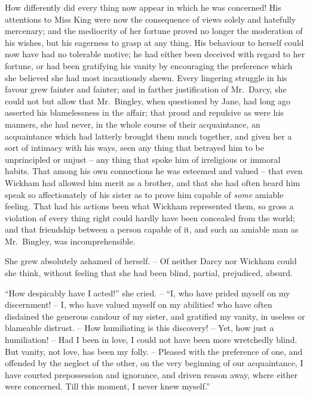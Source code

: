 How differently did every thing now appear in which
he was concerned! His attentions to Miss King were
now the consequence of views solely and hatefully mercenary;
and the mediocrity of her fortune proved no longer
the moderation of his wishes, but his eagerness to grasp
at any thing. His behaviour to herself could now have
had no tolerable motive; he had either been deceived
with regard to her fortune, or had been gratifying his
vanity by encouraging the preference which she believed
she had most incautiously shewn. Every lingering struggle
in his favour grew fainter and fainter; and in farther
justification of Mr.\ Darcy, she could not but allow that
Mr.\ Bingley, when questioned by Jane, had long ago
asserted his blamelessness in the affair; that proud and
repulsive as were his manners, she had never, in the whole
course of their acquaintance, an acquaintance which had
latterly brought them much together, and given her a sort
of intimacy with his ways, seen any thing that betrayed
him to be unprincipled or unjust -- any thing that spoke
him of irreligious or immoral habits. That among his
own connections he was esteemed and valued -- that even
Wickham had allowed him merit as a brother, and that
she had often heard him speak so affectionately of his
sister as to prove him capable of \textit{some} amiable feeling.
That had his actions been what Wickham represented
them, so gross a violation of every thing right could hardly
have been concealed from the world; and that friendship
between a person capable of it, and such an amiable man
as Mr.\ Bingley, was incomprehensible.

She grew absolutely ashamed of herself. -- Of neither
Darcy nor Wickham could she think, without feeling that
she had been blind, partial, prejudiced, absurd.

“How despicably have I acted!” she cried. -- “I, who
have prided myself on my discernment! -- I, who have
valued myself on my abilities! who have often disdained
the generous candour of my sister, and gratified my vanity,
in useless or blameable distrust. -- How humiliating is this
discovery! -- Yet, how just a humiliation! -- Had I been
in love, I could not have been more wretchedly blind.
But vanity, not love, has been my folly. -- Pleased with
the preference of one, and offended by the neglect of the
other, on the very beginning of our acquaintance, I have
courted prepossession and ignorance, and driven reason
away, where either were concerned. Till this moment,
I never knew myself.”

